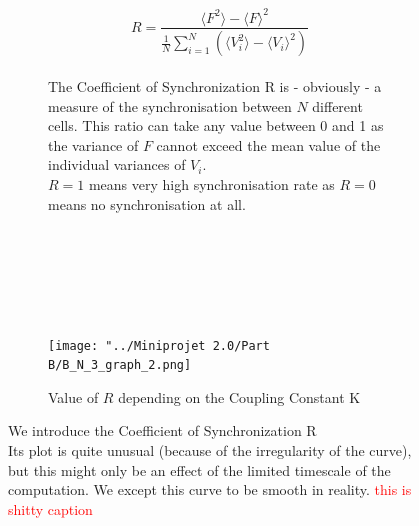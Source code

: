 \documentclass[10pt,a4paper,oneside,twocolumn]{article}
\newcommand{\red}[1]{\textcolor{red}{#1}}
\numberwithin{equation}{section} %
\begin{document}
    \begin{figure}
    \centering
	    \begin{subfigure}[b]{0.35\textwidth}
	    \begin{equation*}R = \frac{\langle F^2 \rangle - {\langle F \rangle}^2}{\frac{1}{N}\sum_{i=1}^{N}(\langle V_i^2 \rangle - {\langle V_i \rangle}^2)} \end{equation*}
	    \hfill \\
	    \centering
	    \footnotesize{The Coefficient of Synchronization R is - obviously - a measure of the synchronisation between $N$ different cells. This ratio can take any value between 0 and 1 as the variance of $F$ cannot exceed the mean value of the individual variances of $V_i$. \\
	    $R=1$ means very high synchronisation rate as $R=0$ means no synchronisation at all.}
	    \captionsetup{labelformat=empty}
	    \caption{\hfill \\ \hfill \\ \hfill \\} 	%
	\end{subfigure}
	~
	\begin{subfigure}[b]{0.35\textwidth}
	    \texttt{[image: "../Miniprojet 2.0/Part B/B\_N\_3\_graph\_2.png]}
	    \caption{\footnotesize{Value of $R$ depending on the Coupling Constant K}}
	\end{subfigure}
	\caption{We introduce the Coefficient of Synchronization R \\
	Its plot is quite unusual (because of the irregularity of the curve), but this might only be an effect of the limited timescale of the computation. We except this curve to be smooth in reality. \red{this is shitty caption}}
    \end{figure}
\end{document}
